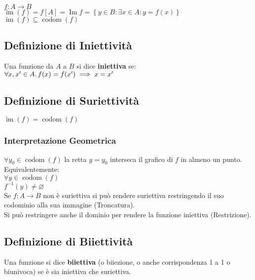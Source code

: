 \documentclass[a4paper, twoside, italian, 11pt]{book}
\newcommand{\braces}[1] {\left \{ #1 \right \}}
\DeclareMathOperator{\codom}{codom}
\DeclareMathOperator{\Ima}{Im}
\DeclareMathOperator{\im}{im}
\let\emptyset\varnothing
\begin{document}
\noindent
$f : A \rightarrow B$ \\
$\im(f) = f[A] = \Ima f= \braces{y \in B : \exists x \in A : y = f(x)}$ \\

\noindent
$\im(f) \subseteq \codom(f)$


\subsection{Definizione di Iniettività}

\noindent
Una funzione da $A$ a $B$ si dice \textbf{iniettiva} se: \\

$\forall x, x' \in A \ldotp f(x) = f(x') \implies x = x'$


\subsection{Definizione di Suriettività}

\noindent
$\im(f) = \codom(f)$


\subsubsection{Interpretazione Geometrica}

\noindent
$\forall y_0 \in \codom(f)$ la retta $y = y_0$ interseca il grafico di $f$ in almeno un punto. \\

\noindent
Equivalentemente: \\
\indent
$\forall y \in \codom(f)$ \\
\indent
$f^{-1}({y}) \neq \emptyset$ \\

\noindent
Se $f : A \rightarrow B$ non è suriettiva si può rendere suriettiva restringendo il suo codominio alla sua immagine (Troncatura). \\

\noindent
Si può restringere anche il dominio per rendere la funzione iniettiva (Restrizione). %


\subsection{Definizione di Biiettività}

\noindent
Una funzione si dice \textbf{biiettiva} (o biiezione, o anche corrispondenza 1 a 1 o biunivoca) se è sia iniettiva che suriettiva.
\end{document}
